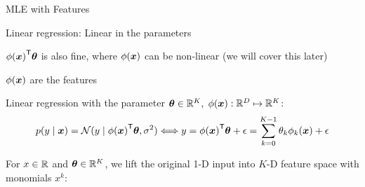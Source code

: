 \documentclass[handout,fleqn,aspectratio=169]{beamer}
\begin{document}
\begin{frame}{MLE with Features}

\plitemsep 0.07in

\bci 

\item Linear regression: Linear in the parameters
\bci
\item ${\phi(\bm{x})}^{\mathsf{T}} \bm{\theta}$ is also fine, where $\phi(\bm{x})$ can be non-linear (we will cover this later)
\item $\phi(\bm{x})$ are the features
\eci

\item Linear regression with the parameter $\bm{\theta} \in {\mathbb R}^K,$ $\phi(\bm{x}): {\mathbb R}^{D} \mapsto {\mathbb R}^K$:
$$
p(y \mid \bm{x}) = \mathcal N(y \mid {\phi(\bm{x})}^{\mathsf{T}} \bm{\theta}, \sigma^2) \Longleftrightarrow y = {\phi(\bm{x})}^{\mathsf{T}} \bm{\theta} + \epsilon = \sum_{k=0}^{K-1} \theta_k \phi_k(\bm{x}) + \epsilon
$$

\item \exam {} For $x\in {\mathbb R}$ and $\bm{\theta} \in {\mathbb R}^K$, we lift the original 1-D input into $K$-D feature space with monomials $x^k$:

\eci
\end{frame}
\end{document}
